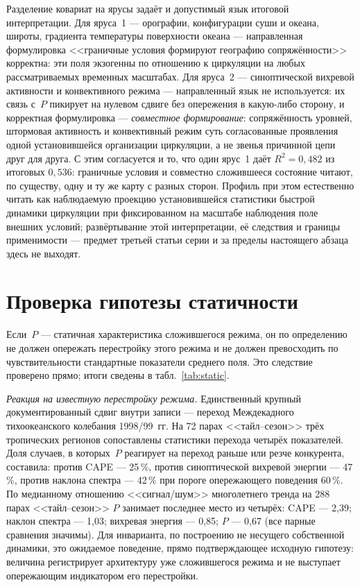 \documentclass[11pt,a4paper]{article}
\begin{document}
Разделение ковариат на ярусы задаёт и допустимый язык итоговой интерпретации. Для яруса~1 --- орографии, конфигурации суши и океана, широты, градиента температуры поверхности океана --- направленная формулировка <<граничные условия формируют географию сопряжённости>> корректна: эти поля экзогенны по отношению к циркуляции на любых рассматриваемых временных масштабах. Для яруса~2 --- синоптической вихревой активности и конвективного режима --- направленный язык не используется: их связь с~$P$ пикирует на нулевом сдвиге без опережения в какую-либо сторону, и корректная формулировка --- \emph{совместное формирование}: сопряжённость уровней, штормовая активность и конвективный режим суть согласованные проявления одной установившейся организации циркуляции, а не звенья причинной цепи друг для друга. С этим согласуется и то, что один ярус~1 даёт $R^2=0{,}482$ из итоговых $0{,}536$: граничные условия и совместно сложившееся состояние читают, по существу, одну и ту же карту с разных сторон. Профиль при этом естественно читать как наблюдаемую проекцию установившейся статистики быстрой динамики циркуляции при фиксированном на масштабе наблюдения поле внешних условий; развёртывание этой интерпретации, её следствия и границы применимости --- предмет третьей статьи серии и за пределы настоящего абзаца здесь не выходят.

\section{Проверка гипотезы статичности}
\label{sec:static}

Если~$P$ --- статичная характеристика сложившегося режима, он по определению не должен опережать перестройку этого режима и не должен превосходить по чувствительности стандартные показатели среднего поля. Это следствие проверено прямо; итоги сведены в табл.~\ref{tab:static}.

\emph{Реакция на известную перестройку режима.} Единственный крупный документированный сдвиг внутри записи --- переход Междекадного тихоокеанского колебания 1998/99~гг. На 72 парах <<тайл--сезон>> трёх тропических регионов сопоставлены статистики перехода четырёх показателей. Доля случаев, в которых~$P$ реагирует на переход раньше или резче конкурента, составила: против CAPE --- 25\,\%, против синоптической вихревой энергии --- 47\,\%, против наклона спектра --- 42\,\% при пороге опережающего поведения 60\,\%. По медианному отношению <<сигнал/шум>> многолетнего тренда на 288 парах <<тайл--сезон>> $P$ занимает последнее место из четырёх: CAPE --- 2,39; наклон спектра --- 1,03; вихревая энергия --- 0,85; $P$ --- 0,67 (все парные сравнения значимы). Для инварианта, по построению не несущего собственной динамики, это ожидаемое поведение, прямо подтверждающее исходную гипотезу: величина регистрирует архитектуру уже сложившегося режима и не выступает опережающим индикатором его перестройки.
\end{document}

